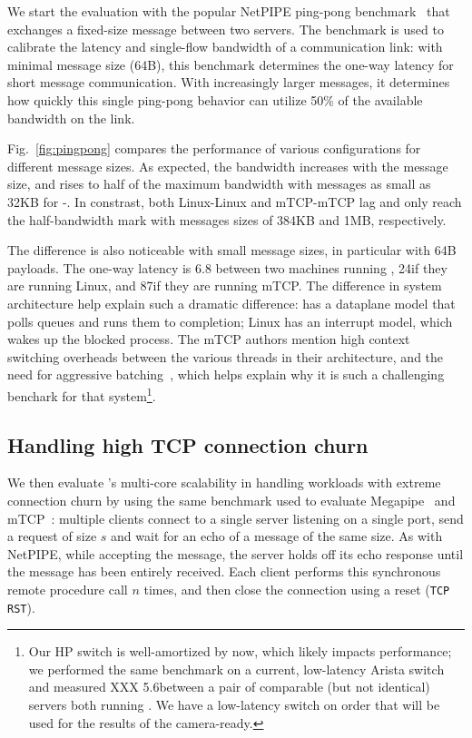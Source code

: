 We start the evaluation with the popular NetPIPE ping-pong
benchmark~\cite{snell1996netpipe} that exchanges a fixed-size message
between two servers.  The benchmark is used to calibrate the latency
and single-flow bandwidth of a communication link: with minimal
message size (64B), this benchmark determines the one-way latency for
short message communication.  With increasingly larger messages, it
determines how quickly this single ping-pong behavior can utilize 50\%
of the available bandwidth on the link.


Fig.~\ref{fig:pingpong} compares the performance of various
configurations for different message sizes.  As expected, the
bandwidth increases with the message size, and rises to half of the
maximum bandwidth with messages as small as 32KB for \ix-\ix.  In
constrast, both Linux-Linux and mTCP-mTCP lag and only reach the
half-bandwidth mark with messages sizes of 384KB and 1MB,
respectively.  

The difference is also noticeable with small message sizes, in
particular with 64B payloads.  The one-way latency is 6.8\microsecond
between two machines running \ix, 24\microsecond if they are running
Linux, and 87\microsecond if they are running mTCP.  The
difference in system architecture help explain such a dramatic
difference: \ix has a dataplane model that polls queues and runs them
to completion; Linux has an interrupt model, which wakes up the
blocked process.  The mTCP authors mention high context switching
overheads between the various threads in their architecture, and the
need for aggressive batching~\cite{jeong2014mtcp}, which helps explain
why it is such a challenging benchark for that system\footnote{Our HP
  switch is well-amortized by now, which likely impacts performance;
  we performed the same benchmark on a current, low-latency Arista
  switch and measured XXX 5.6\microsecond between a pair of comparable
  (but not identical) servers both running \ix. We have a low-latency
  switch on order that will be used for the results of the
  camera-ready.}.

\subsection{Handling high TCP connection churn}
\label{sec:eval:short}


We then evaluate \ix's multi-core scalability in handling workloads
with extreme connection churn by using the same benchmark used to evaluate
Megapipe~\cite{han2012megapipe} and mTCP~\cite{jeong2014mtcp}:
multiple clients connect to a single server listening on a single
port, send a request of size $s$ and wait for an echo of a message of
the same size.  As with NetPIPE, while accepting the message, the server holds off its
echo response until the message has been entirely received.
Each client performs this synchronous remote procedure
call $n$ times, and then close the connection using a reset
(\texttt{TCP RST}).


